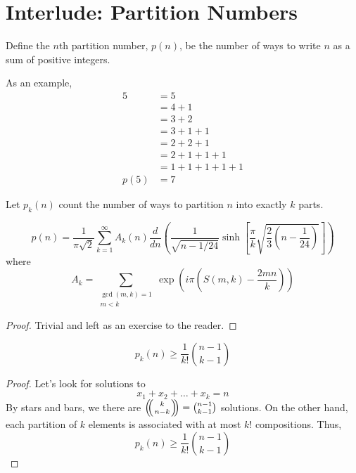
\section{Interlude: Partition Numbers}

\begin{definition}
    Define the $n$th partition number, $p(n)$, be the number of ways to write $n$ as a
sum of positive integers.
\end{definition}

As an example,
\begin{align*}
    5 &= 5 \\
&= 4 + 1 \\
&= 3 + 2 \\
&= 3 + 1 + 1\\
&= 2 + 2 + 1\\
&= 2 + 1 + 1 + 1\\
&= 1 + 1 + 1 + 1 + 1\\
p(5) &= 7
\end{align*}
\begin{definition}
    Let $p_k(n)$ count the number of ways to partition $n$ into exactly $k$ parts. 
\end{definition}
\begin{theorem}
    \[
        p(n) = \frac 1{\pi \sqrt 2} \sum_{k=1}^\infty A_k(n) \frac d{dn} 
        \left(\frac 1 {\sqrt{n - 1/24}} \sinh \left[\frac \pi k \sqrt{\frac 23 \left( n - \frac 1 {24} \right)} \right] \right) 
    \]
    where 
    \[
        A_k = \sum_{\substack{\gcd(m, k) = 1 \\ m < k}} \exp \left( i \pi \left( S(m, k) - \frac{2mn}k \right) \right)
    \]
\end{theorem}
\begin{proof}
    Trivial and left as an exercise to the reader.
\end{proof}

\begin{theorem}
    \[
        p_k(n) \geq \frac 1{k!} \binom{n-1}{k-1}
    \]
\end{theorem}
\begin{proof}
    Let's look for solutions to 
    \[ x_1 + x_2 + \dots + x_k = n \]
    By stars and bars, we there are $\snb k {n-k} = \binom{n-1}{k-1}$ solutions. 
On the other hand, each partition of $k$ elements is associated with at most $k!$
compositions. Thus, 
\[ p_k(n) \geq \frac 1{k!} \binom{n-1}{k-1}\]
\end{proof}

